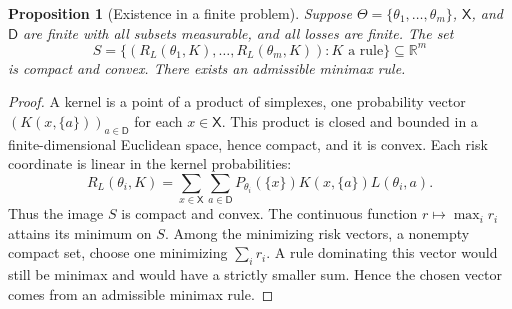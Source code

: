 \documentclass[11pt,oneside]{book}
\newtheorem{proposition}[theorem]{Proposition}
\theoremstyle{definition}
\theoremstyle{remark}
\newcommand{\R}{\mathbb R}
\begin{document}
\begin{proposition}[Existence in a finite problem]
\label{prop:finite-minimax-existence}
Suppose $\Theta=\{\theta_1,\ldots,\theta_m\}$, $\mathsf X$, and
$\mathsf D$ are finite with all subsets measurable, and all losses are
finite. The set
\[
S=\{(R_L(\theta_1,K),\ldots,R_L(\theta_m,K)):K\text{ a rule}\}
\subseteq\R^m
\]
is compact and convex. There exists an admissible minimax rule.
\end{proposition}
\begin{proof}
A kernel is a point of a product of simplexes, one probability vector
$(K(x,\{a\}))_{a\in\mathsf D}$ for each $x\in\mathsf X$. This product is
closed and bounded in a finite-dimensional Euclidean space, hence
compact, and it is convex. Each risk coordinate is linear in the
kernel probabilities:
\[
R_L(\theta_i,K)
=\sum_{x\in\mathsf X}\sum_{a\in\mathsf D}
P_{\theta_i}(\{x\})K(x,\{a\})L(\theta_i,a).
\]
Thus the image $S$ is compact and convex. The continuous function
$r\mapsto\max_i r_i$ attains its minimum on $S$. Among the minimizing
risk vectors, a nonempty compact set, choose one minimizing
$\sum_i r_i$. A rule dominating this vector would still be minimax
and would have a strictly smaller sum. Hence the chosen vector
comes from an admissible minimax rule.
\end{proof}
\end{document}
